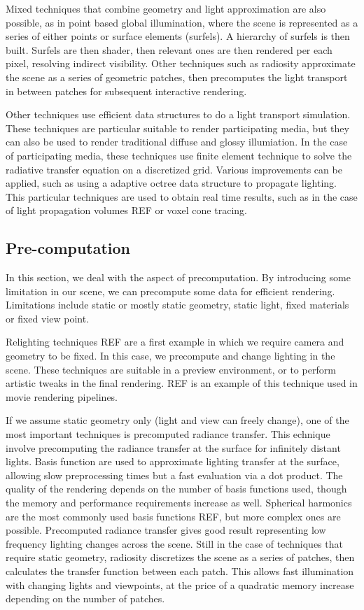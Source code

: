Mixed techniques that combine geometry and light approximation are also possible, as in point based global illumination, where the scene is represented as a series of either points or surface elements (surfels). A hierarchy of surfels is then built. Surfels are then shader, then relevant ones are then rendered per each pixel, resolving indirect visibility. Other techniques such as radiosity approximate the scene as a series of geometric patches, then precomputes the light transport in between patches for subsequent interactive rendering. 

Other techniques use efficient data structures to do a light transport simulation. These techniques are particular suitable to render participating media, but they can also be used to render traditional diffuse and glossy illumiation. In the case of participating media, these techniques use finite element technique to solve the radiative transfer equation on a discretized grid. Various improvements can be applied, such as using a adaptive octree data structure to propagate lighting. This particular techniques are used to obtain real time results, such as in the case of light propagation volumes REF or voxel cone tracing. 

\subsection{Pre-computation}
In this section, we deal with the aspect of precomputation. By introducing some limitation in our scene, we can precompute some data for efficient rendering. Limitations include static or mostly static geometry, static light, fixed materials or fixed view point. 

Relighting techniques REF are a first example in which we require camera and geometry to be fixed. In this case, we precompute and change lighting in the scene. These techniques are suitable in a preview environment, or to perform artistic tweaks in the final rendering. REF is an example of this technique used in movie rendering pipelines. 

If we assume static geometry only (light and view can freely change), one of the most important techniques is precomputed radiance transfer. This echnique involve precomputing the radiance transfer at the surface for infinitely distant lights. Basis function are used to approximate lighting transfer at the surface, allowing slow preprocessing times but a fast evaluation via a dot product. The quality of the rendering depends on the number of basis functions used, though the memory and performance requirements increase as well. Spherical harmonics are the most commonly used basis functions REF, but more complex ones are possible. Precomputed radiance transfer gives good result representing low frequency lighting changes across the scene. Still in the case of techniques that require static geometry, radiosity discretizes the scene as a series of patches, then calculates the transfer function between each patch. This allows fast illumination with changing lights and viewpoints, at the price of a quadratic memory increase depending on the number of patches. 

